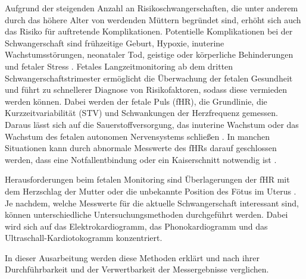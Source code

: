 \documentclass[10pt,a4paper,headinclude,twoside, plainheadsepline, open=right, numbers=noenddot, twocolumn]{article}
\begin{document}
Aufgrund der steigenden Anzahl an Risikoschwangerschaften, die unter anderem durch das höhere Alter von werdenden Müttern begründet sind, %
erhöht sich auch das Risiko für auftretende Komplikationen.
Potentielle Komplikationen bei der Schwangerschaft sind frühzeitige Geburt, Hypoxie, inuterine Wachstumsstörungen, neonataler Tod, geistige oder körperliche Behinderungen und fetaler Stress \cite{adithya2017trends}.
Fetales Langzeitmonitoring ab dem dritten Schwangerschaftstrimester ermöglicht die Überwachung der fetalen Gesundheit und führt zu schnellerer Diagnose von Risikofaktoren, sodass diese vermieden werden können.
Dabei werden der fetale Puls (fHR), die Grundlinie, die Kurzzeitvariabilität (STV) und Schwankungen der Herzfrequenz gemessen.
Daraus lässt sich auf die Sauerstoffversorgung, das inuterine Wachstum oder das Wachstum des fetalen autonomen Nervensystems schließen \cite{kovacs2011extended}.
In manchen Situationen kann durch abnormale Messwerte des fHRs darauf geschlossen werden, dass eine Notfallentbindung oder ein Kaiserschnitt notwendig ist \cite{hasan2009detection}.


Herausforderungen beim fetalen Monitoring sind Überlagerungen der fHR mit dem Herzschlag der Mutter oder die unbekannte Position des Fötus im Uterus \cite{kovacs2011fetal}.
Je nachdem, welche Messwerte für die aktuelle Schwangerschaft interessant sind, können unterschiedliche Untersuchungsmethoden durchgeführt werden.
Dabei wird sich auf das Elektrokardiogramm, das Phonokardiogramm und das Ultraschall-Kardiotokogramm konzentriert.

In dieser Ausarbeitung werden diese Methoden erklärt und nach ihrer Durchführbarkeit und der Verwertbarkeit der Messergebnisse verglichen.



\end{document}
